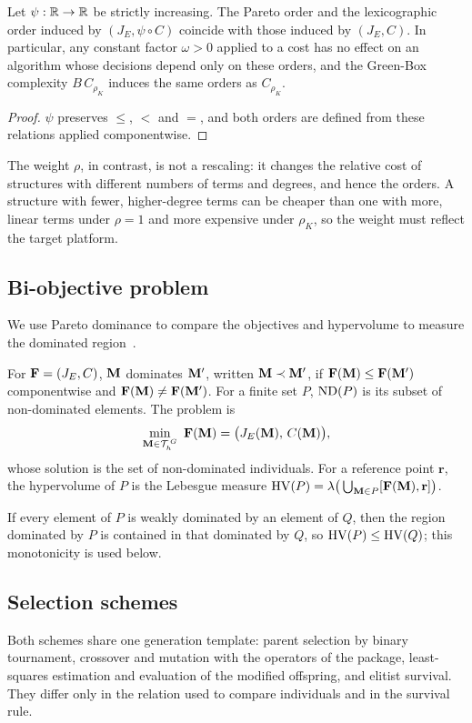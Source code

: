 \begin{proposition}\label{prop:rescaling}
Let $\psi:\mathbb{R}\to\mathbb{R}$ be strictly increasing. The Pareto order and the lexicographic order induced by $(J_E,\psi\circ C)$
coincide with those induced by $(J_E,C)$. In particular, any constant factor $\omega>0$ applied to a cost has no effect
on an algorithm whose decisions depend only on these orders, and the Green-Box complexity $B\,C_{\rho_K}$ induces the
same orders as $C_{\rho_K}$.
\end{proposition}
\begin{proof}
$\psi$ preserves $\le$, $<$ and $=$, and both orders are defined from these relations applied componentwise.
\end{proof}

The weight $\rho$, in contrast, is not a rescaling: it changes the relative cost of structures with different numbers of
terms and degrees, and hence the orders. A structure with fewer, higher-degree terms can be cheaper than one with more,
linear terms under $\rho=1$ and more expensive under $\rho_K$, so the weight must reflect the target platform.

\subsection{Bi-objective problem}
We use Pareto dominance to compare the objectives and hypervolume to measure the dominated region~\cite{ZT1999}.

\begin{definition}\label{def:pareto}
For $\mathbf{F}=(J_E,C)$, $\mathbf{M}$ dominates $\mathbf{M}'$, written $\mathbf{M}\prec\mathbf{M}'$, if $\mathbf{F}(\mathbf{M})\le\mathbf{F}(\mathbf{M}')$ componentwise and
$\mathbf{F}(\mathbf{M})\ne\mathbf{F}(\mathbf{M}')$. For a finite set $P$, $\operatorname{ND}(P)$ is its subset of non-dominated elements. The problem is
\begin{equation}
\min_{\M\in\Gen_h^{\,G}}\ \F(\M)=\big(J_E(\M),\,C(\M)\big),
\label{eq:mop}
\end{equation}
whose solution is the set of non-dominated individuals. For a reference point $\mathbf r$, the hypervolume of $P$
is the Lebesgue measure $\operatorname{HV}(P)=\lambda\big(\bigcup_{\mathbf{M}\in P}[\mathbf{F}(\mathbf{M}),\mathbf r]\big)$.
\end{definition}

If every element of $P$ is weakly dominated by an element of $Q$, then the region dominated by $P$ is contained in
that dominated by $Q$, so $\operatorname{HV}(P)\le\operatorname{HV}(Q)$; this monotonicity is used below.

\subsection{Selection schemes}
Both schemes share one generation template: parent selection by binary tournament, crossover and mutation with the
operators of the package, least-squares estimation and evaluation of the modified offspring, and elitist survival.
They differ only in the relation used to compare individuals and in the survival rule.

